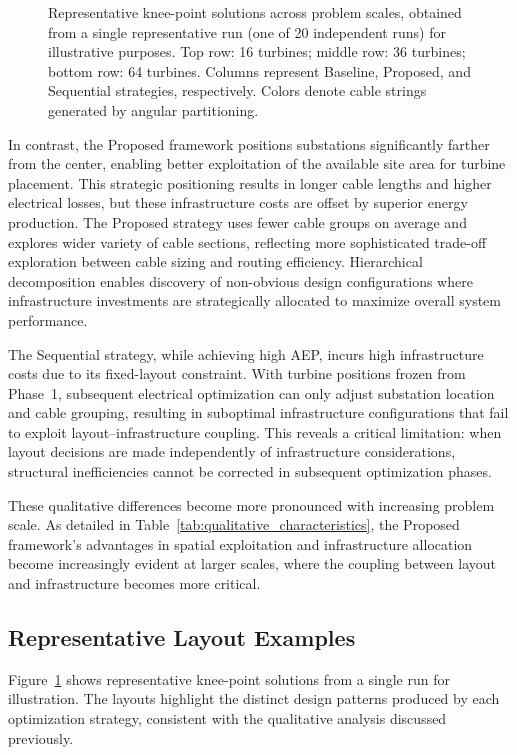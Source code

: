 \documentclass[format=sigconf,anonymous=true,review=true]{acmart}
\begin{document}
\begin{figure}[!t]
\caption{Representative knee-point solutions across problem scales, obtained from a single representative run (one of 20 independent runs) for illustrative purposes. Top row: 16 turbines; middle row: 36 turbines; bottom row: 64 turbines. Columns represent Baseline, Proposed, and Sequential strategies, respectively. Colors denote cable strings generated by angular partitioning.}
\label{fig:layout_examples}
\end{figure}

In contrast, the Proposed framework positions substations significantly farther from the center, enabling better exploitation of the available site area for turbine placement. This strategic positioning results in longer cable lengths and higher electrical losses, but these infrastructure costs are offset by superior energy production. The Proposed strategy uses fewer cable groups on average and explores wider variety of cable sections, reflecting more sophisticated trade-off exploration between cable sizing and routing efficiency. Hierarchical decomposition enables discovery of non-obvious design configurations where infrastructure investments are strategically allocated to maximize overall system performance.

The Sequential strategy, while achieving high AEP, incurs high infrastructure costs due to its fixed-layout constraint. With turbine positions frozen from Phase~1, subsequent electrical optimization can only adjust substation location and cable grouping, resulting in suboptimal infrastructure configurations that fail to exploit layout--infrastructure coupling. This reveals a critical limitation: when layout decisions are made independently of infrastructure considerations, structural inefficiencies cannot be corrected in subsequent optimization phases.

These qualitative differences become more pronounced with increasing problem scale. As detailed in Table~\ref{tab:qualitative_characteristics}, the Proposed framework's advantages in spatial exploitation and infrastructure allocation become increasingly evident at larger scales, where the coupling between layout and infrastructure becomes more critical.



\subsection{Representative Layout Examples}

Figure~\ref{fig:layout_examples} shows representative knee-point solutions from a single run for illustration. The layouts highlight the distinct design patterns produced by each optimization strategy, consistent with the qualitative analysis discussed previously.
\end{document}

